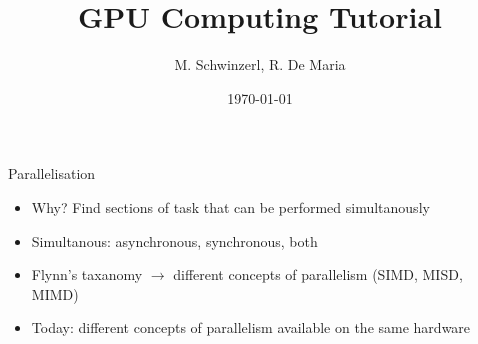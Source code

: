 \documentclass{beamer}
\title[GPU Computing]{GPU Computing Tutorial} %
\author{M. Schwinzerl, R. De Maria } %
\institute[CERN] %
{
CERN \\ %
\medskip
\textit{riccardo.de.maria@cern.ch, martin.schwinzerl@cern.ch} %
}
\date{\today} %
\begin{document}
\begin{frame}
\titlepage %
\end{frame}





\begin{frame}{Parallelisation}
\begin{itemize}
    \item Why? Find sections of task that can be performed simultanously
    \item Simultanous: asynchronous, synchronous, both
    \item Flynn's taxanomy $\longrightarrow$ different concepts of parallelism (SIMD, MISD, MIMD)
    \item Today: different concepts of parallelism available on the same hardware
\end{itemize}
    
\end{frame}
\end{document}
